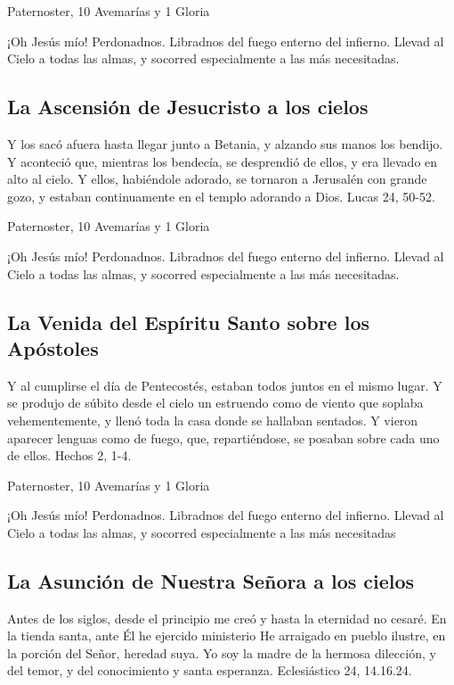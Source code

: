 \documentclass[a4paper,11pt, oneside]{report}
\begin{document}
         Paternoster, 10 Avemarías y 1 Gloria
        
        \medskip
        ¡Oh Jesús mío! Perdonadnos. Libradnos del fuego enterno del infierno. Llevad al Cielo a todas las almas, y socorred especialmente a las más necesitadas.
      
      \subsection*{La Ascensión de Jesucristo a los cielos}
        Y los sacó afuera hasta llegar junto a Betania, y alzando sus manos los bendijo. Y aconteció que, mientras los bendecía, se desprendió de ellos,
        y era llevado en alto al cielo. Y ellos, habiéndole adorado, se tornaron a Jerusalén con grande gozo, y estaban continuamente en el templo
        adorando a Dios. Lucas 24, 50-52.

         Paternoster, 10 Avemarías y 1 Gloria
        
        \medskip
        ¡Oh Jesús mío! Perdonadnos. Libradnos del fuego enterno del infierno. Llevad al Cielo a todas las almas, y socorred especialmente a las más necesitadas.
        
      \subsection*{La Venida del Espíritu Santo sobre los Apóstoles}
        Y al cumplirse el día de Pentecostés, estaban todos juntos en el mismo lugar. Y se produjo de súbito desde el cielo un estruendo como de viento
        que soplaba vehementemente, y llenó toda la casa donde se hallaban sentados. Y vieron aparecer lenguas como de fuego, que, repartiéndose, se 
        posaban sobre cada uno de ellos. Hechos 2, 1-4.

         Paternoster, 10 Avemarías y 1 Gloria
        
        \medskip
        ¡Oh Jesús mío! Perdonadnos. Libradnos del fuego enterno del infierno. Llevad al Cielo a todas las almas, y socorred especialmente a las más 
        necesitadas

      \subsection*{La Asunción de Nuestra Señora a los cielos}
        Antes de los siglos, desde el principio me creó y hasta la eternidad no cesaré. En la tienda santa, ante Él he ejercido ministerio
        He arraigado en pueblo ilustre, en la porción del Señor, heredad suya. Yo soy la madre de la hermosa dilección, y del temor, y del
        conocimiento y santa esperanza. Eclesiástico 24, 14.16.24.
\end{document}
